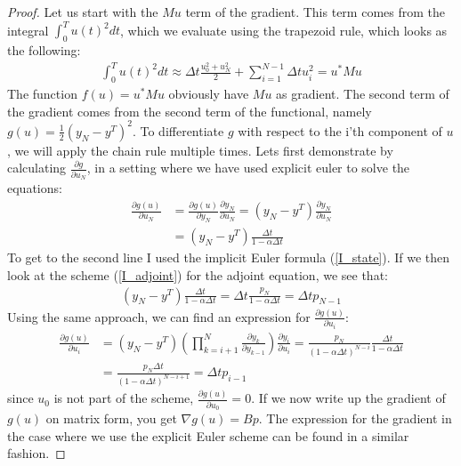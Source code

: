 \documentclass[11pt,a4paper]{article}
\begin{document}
\begin{proof}
Let us start with the $Mu$ term of the gradient. This term comes from the integral $\int_0^T u(t)^2dt$, which we evaluate using the trapezoid rule, which looks as the following:
\begin{align*}
\int_0^T u(t)^2dt \approx \Delta t\frac{u_0^2+u_N^2}{2} + \sum_{i=1}^{N-1} \Delta t u_i^2 = u^*Mu
\end{align*} 
The function $f(u)=u^*Mu$ obviously have $Mu$ as gradient. The second term of the gradient comes from the second term of the functional, namely $g(u)=\frac{1}{2}(y_N -y^T)^2$. To differentiate $g$ with respect to the i'th component of $u$, we will apply the chain rule multiple times. Lets first demonstrate by calculating $\frac{\partial g}{\partial u_N}$, in a setting where we have used explicit euler to solve the equations:
\begin{align*}
\frac{\partial g(u)}{\partial u_N} &= \frac{\partial g(u)}{\partial y_N}\frac{\partial y_N}{\partial u_N} = (y_N -y^T)\frac{\partial y_N}{\partial u_N}\\
&= (y_N -y^T)\frac{\Delta t}{1-\alpha\Delta t}
\end{align*}
To get to the second line I used the implicit Euler formula (\ref{I_state}). If we then look at the scheme (\ref{I_adjoint}) for the adjoint equation, we see that:
\begin{align*}
(y_N -y^T)\frac{\Delta t}{1-\alpha\Delta t} = \Delta t\frac{p_N}{1-\alpha\Delta t} = \Delta t p_{N-1}
\end{align*} 
Using the same approach, we can find an expression for $\frac{\partial g(u)}{\partial u_i}$: 
\begin{align*}
\frac{\partial g(u)}{\partial u_i} &= (y_N -y^T) (\prod_{k=i+1}^{N}\frac{\partial y_{k}}{\partial y_{k-1}}) \frac{\partial y_i}{\partial u_{i}} = \frac{p_N}{(1-\alpha\Delta t)^{N-i}}\frac{\Delta t}{1-\alpha\Delta t} \\
&= \frac{p_N\Delta t}{(1-\alpha\Delta t)^{N-i+1}}=\Delta t p_{i-1}
\end{align*}
since $u_0$ is not part of the scheme, $\frac{\partial g(u)}{\partial u_0}=0$. If we now write up the gradient of $g(u)$ on matrix form, you get $\nabla g(u) = Bp$. The expression for the gradient in the case where we use the explicit Euler scheme can be found in a similar fashion. 
\end{proof}
\end{document}
